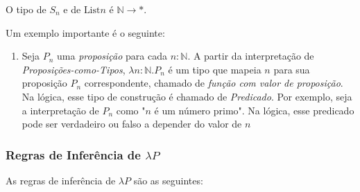 \documentclass[../main.tex]{subfiles}
\begin{document}
O tipo de $S_n$ e de $\text{List}n$ é $\mathbb{N} \to \ast$.

Um exemplo importante é o seguinte:

\begin{enumerate}[label=(\arabic*)]\addtocounter{enumi}{2}
    \item Seja $P_n$ uma \emph{proposição} para cada $n : \mathbb{N}$. A partir da interpretação de \emph{Proposições-como-Tipos}, $\lambda n : \mathbb{N} . P_n$ é um tipo que mapeia $n$ para sua proposição $P_n$ correspondente, chamado de \emph{função com valor de proposição}. \\
    Na lógica, esse tipo de construção é chamado de \emph{Predicado}. Por exemplo, seja a interpretação de $P_n$ como "$n$ é um número primo". Na lógica, esse predicado pode ser verdadeiro ou falso a depender do valor de $n$
\end{enumerate}

\subsubsection{Regras de Inferência de \texorpdfstring{$\lambda P$}{lP}}


As regras de inferência de $\lambda P$ são as seguintes:
\end{document}
